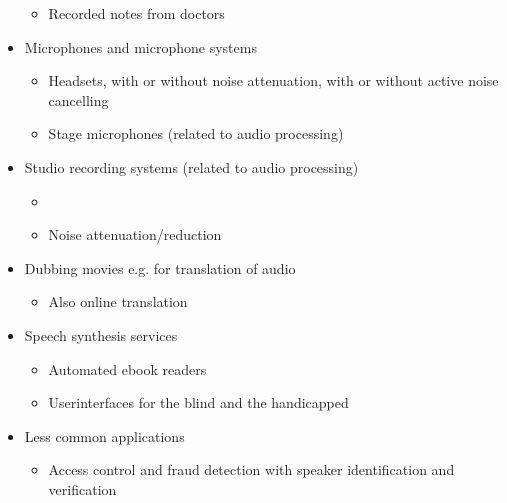 \documentclass[letterpaper,10pt,english]{jupyterBook}
\begin{document}
\begin{itemize}
\begin{itemize}
\item {} 
\sphinxAtStartPar
Recorded notes from doctors

\end{itemize}

\item {} 
\sphinxAtStartPar
Microphones and microphone systems
\begin{itemize}
\item {} 
\sphinxAtStartPar
Headsets, with or without noise attenuation, with or without
active noise cancelling

\item {} 
\sphinxAtStartPar
Stage microphones (related to audio processing)

\end{itemize}

\item {} 
\sphinxAtStartPar
Studio recording systems (related to audio processing)
\begin{itemize}
\item {} 
\sphinxAtStartPar
{}

\item {} 
\sphinxAtStartPar
Noise attenuation/reduction

\end{itemize}

\item {} 
\sphinxAtStartPar
Dubbing movies e.g. for translation of audio
\begin{itemize}
\item {} 
\sphinxAtStartPar
Also on\sphinxhyphen{}line translation

\end{itemize}

\item {} 
\sphinxAtStartPar
Speech synthesis services
\begin{itemize}
\item {} 
\sphinxAtStartPar
Automated e\sphinxhyphen{}book readers

\item {} 
\sphinxAtStartPar
User\sphinxhyphen{}interfaces for the blind and the handicapped

\end{itemize}

\item {} 
\sphinxAtStartPar
Less common applications
\begin{itemize}
\item {} 
\sphinxAtStartPar
Access control and fraud detection with speaker identification
and verification


\end{itemize}
\end{itemize}
\end{document}
